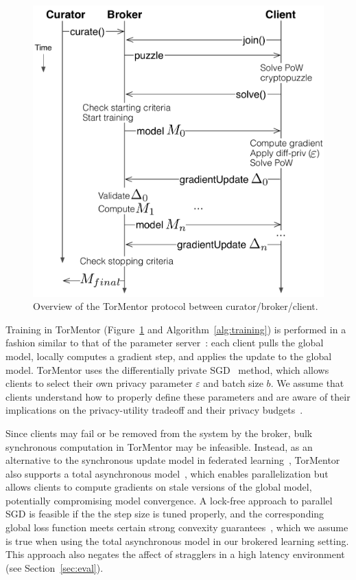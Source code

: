 \begin{figure}[t]
  \centering
  \includegraphics[width=.9\linewidth]{fig/tormentor-protocol.pdf}
  \caption{Overview of the TorMentor protocol between
    curator/broker/client.
    }
  \label{fig:protocol}
\end{figure}

Training in TorMentor (Figure~\ref{fig:protocol} and 
Algorithm~\ref{alg:training}) is performed in a
fashion similar to that of the parameter server~\cite{Li:2014}:
each client pulls the global model, locally computes a gradient step,
and applies the update to the global model. TorMentor uses the
differentially private SGD~\cite{Song:2013} method, which allows
clients to select their own privacy parameter $\varepsilon$ and batch
size $b$. We assume that clients understand how to properly define
these parameters and are aware of their implications on the
privacy-utility tradeoff and their privacy budgets~\cite{Dwork:2014}.

Since clients may fail or be removed from the system by the broker,
bulk synchronous computation in TorMentor may be infeasible. Instead,
as an alternative to the synchronous update model in federated
learning~\cite{McMahan:2017}, TorMentor also supports a total
asynchronous model~\cite{Hsieh:2017, Li:2014}, which enables
parallelization but allows clients to compute gradients on stale
versions of the global model, potentially compromising model
convergence. A lock-free approach to parallel SGD is feasible if
the the step size is tuned properly, and the corresponding global loss
function meets certain strong convexity guarantees~\cite{Recht:2011},
which we assume is true when using the total asynchronous model
in our brokered learning setting. This approach also negates the affect
of stragglers in a high latency environment (see 
Section~\ref{sec:eval}).

